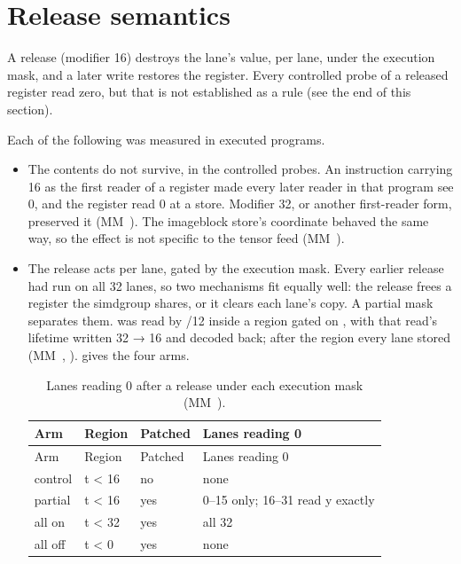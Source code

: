 \section{Release semantics}\label{sec:release-does}

A release (modifier 16) destroys the lane's value, per lane, under the execution mask, and a
later write restores the register. Every controlled probe of a released register read zero, but that is not
established as a rule (see the end of this section).

Each of the following was measured in executed programs.

\begin{itemize}
\item The contents do not survive, in the controlled probes. An instruction carrying 16 as the first reader of a
  register made every later reader in that program see 0, and the register read 0 at a store. Modifier 32, or another
  first-reader form, preserved it (MM~). The imageblock store's coordinate behaved the same way, so the effect is not
  specific to the tensor feed (MM~).
\item The release acts per lane, gated by the execution mask. Every earlier release had run on all 32 lanes, so two
  mechanisms fit equally well: the release frees a register the simdgroup shares, or it clears each lane's copy. A
  partial mask separates them.  was read by /12 inside a
  region gated on , with that read's lifetime written 32 → 16 and decoded back; after the region every lane
  stored  (MM~, ).  gives the four arms.

  \begin{xltabular}{\linewidth}{@{}lllX@{}}
\caption{Lanes reading 0 after a release under each execution mask (MM~).}\label{tab:release-mask-arms}\\
\toprule
Arm & Region & Patched & Lanes reading 0 \\
\midrule
\endfirsthead
{}
\toprule
Arm & Region & Patched & Lanes reading 0 \\
\midrule
\endhead
  control & t < 16 & no & none \\*
  partial & t < 16 & yes & 0–15 only; 16–31 read y exactly \\*
  all on & t < 32 & yes & all 32 \\*
  all off & t < 0 & yes & none \\*
  \bottomrule
\end{xltabular}


\end{itemize}
